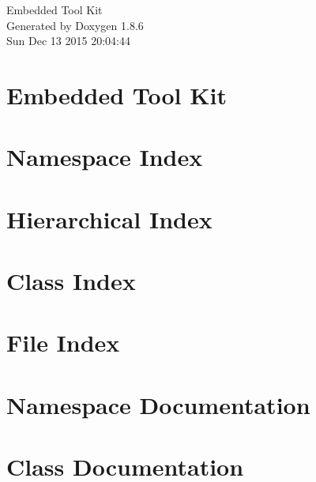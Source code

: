 \documentclass[twoside]{book}
\newcommand{\clearemptydoublepage}{%
  \newpage{\pagestyle{empty}\cleardoublepage}%
}
\begin{document}
\hypersetup{pageanchor=false}
\begin{titlepage}
\vspace*{7cm}
\begin{center}%
{\Large Embedded Tool Kit }\\
\vspace*{1cm}
{\large Generated by Doxygen 1.8.6}\\
\vspace*{0.5cm}
{\small Sun Dec 13 2015 20:04:44}\\
\end{center}
\end{titlepage}
\clearemptydoublepage
\tableofcontents
\clearemptydoublepage
{}
\hypersetup{pageanchor=true}

\chapter{Embedded Tool Kit}
\label{index}\hypertarget{index}{}
\chapter{Namespace Index}

\chapter{Hierarchical Index}

\chapter{Class Index}

\chapter{File Index}

\chapter{Namespace Documentation}


\chapter{Class Documentation}



























\end{document}
